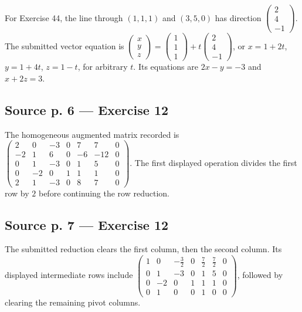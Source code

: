 For Exercise 44, the line through \(\left( {1,1,1} \right)\) and \(\left( {3,5,0} \right)\) has direction \(\begin{pmatrix}
2 \\
4 \\
{- 1}
\end{pmatrix}\). The submitted vector equation is \(\begin{pmatrix}
x \\
y \\
z
\end{pmatrix} = \begin{pmatrix}
1 \\
1 \\
1
\end{pmatrix} + t\begin{pmatrix}
2 \\
4 \\
{- 1}
\end{pmatrix}\), or \(x = 1 + 2t\), \(y = 1 + 4t\), \(z = 1 - t\), for arbitrary \(t\). Its equations are \(2x - y = - 3\) and \(x + 2z = 3\).

\subsection{Source p. 6 --- Exercise 12}

The homogeneous augmented matrix recorded is \(\begin{pmatrix}
2 & 0 & {- 3} & 0 & 7 & 7 & 0 \\
{- 2} & 1 & 6 & 0 & {- 6} & {- 12} & 0 \\
0 & 1 & {- 3} & 0 & 1 & 5 & 0 \\
0 & {- 2} & 0 & 1 & 1 & 1 & 0 \\
2 & 1 & {- 3} & 0 & 8 & 7 & 0
\end{pmatrix}\). The first displayed operation divides the first row by \(2\) before continuing the row reduction.

\subsection{Source p. 7 --- Exercise 12}

The submitted reduction clears the first column, then the second column. Its displayed intermediate rows include \(\begin{pmatrix}
1 & 0 & {- \frac{3}{2}} & 0 & \frac{7}{2} & \frac{7}{2} & 0 \\
0 & 1 & {- 3} & 0 & 1 & 5 & 0 \\
0 & {- 2} & 0 & 1 & 1 & 1 & 0 \\
0 & 1 & 0 & 0 & 1 & 0 & 0
\end{pmatrix}\), followed by clearing the remaining pivot columns.

